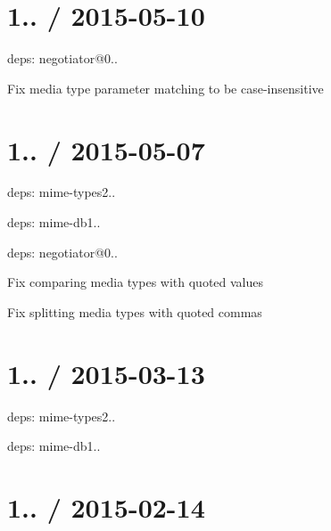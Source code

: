 \section*{1.. / 2015-\/05-\/10 }


\begin{DoxyItemize}
\item deps\+: negotiator@0..
\begin{DoxyItemize}
\item Fix media type parameter matching to be case-\/insensitive
\end{DoxyItemize}
\end{DoxyItemize}

\section*{1.. / 2015-\/05-\/07 }


\begin{DoxyItemize}
\item deps\+: mime-\/types2..
\begin{DoxyItemize}
\item deps\+: mime-\/db1..
\end{DoxyItemize}
\item deps\+: negotiator@0..
\begin{DoxyItemize}
\item Fix comparing media types with quoted values
\item Fix splitting media types with quoted commas
\end{DoxyItemize}
\end{DoxyItemize}

\section*{1.. / 2015-\/03-\/13 }


\begin{DoxyItemize}
\item deps\+: mime-\/types2..
\begin{DoxyItemize}
\item deps\+: mime-\/db1..
\end{DoxyItemize}
\end{DoxyItemize}

\section*{1.. / 2015-\/02-\/14 }


